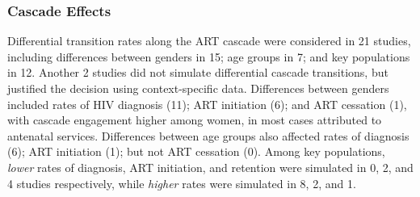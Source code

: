 \subsubsection{Cascade Effects}\label{sr.res.factors.cascade}
Differential transition rates along the ART cascade were considered in
21 studies, including differences between
genders in 15; age groups in 7; and key populations in 12.
Another 2 studies did not simulate differential cascade transitions,
but justified the decision using context-specific data.
Differences between genders included rates of
HIV diagnosis (11); ART initiation (6); and ART cessation (1),
with cascade engagement higher among women,
in most cases attributed to antenatal services.
Differences between age groups also affected
rates of diagnosis (6); ART initiation (1); but not ART cessation (0).
Among key populations, \emph{lower} rates of
diagnosis, ART initiation, and retention were simulated in 0, 2, and 4
studies respectively, while \emph{higher} rates were simulated in 8, 2, and 1.
